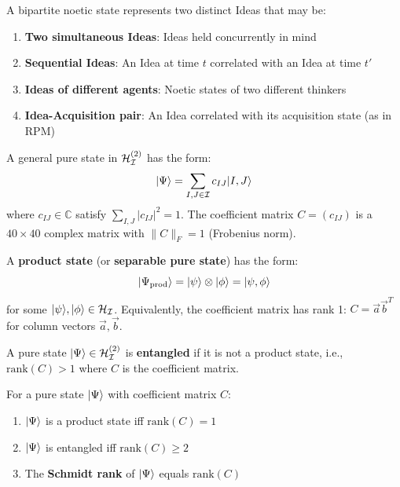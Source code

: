 \begin{remark}
\label{rem:bipartite-interpretation}
A bipartite noetic state represents two distinct Ideas that may be:
\begin{enumerate}
  \item \textbf{Two simultaneous Ideas}: Ideas held concurrently in mind
  \item \textbf{Sequential Ideas}: An Idea at time $t$ correlated with an Idea at time $t'$
  \item \textbf{Ideas of different agents}: Noetic states of two different thinkers
  \item \textbf{Idea-Acquisition pair}: An Idea correlated with its acquisition state (as in RPM)
\end{enumerate}
\end{remark}

\begin{definition}
\label{def:general-bipartite}
A general pure state in $\mathcal{H}_{\mathcal{I}}^{(2)}$ has the form:
\[
|\Psi\rangle = \sum_{I, J \in \mathcal{I}} c_{IJ} |I, J\rangle
\]
where $c_{IJ} \in \mathbb{C}$ satisfy $\sum_{I,J} |c_{IJ}|^2 = 1$. The coefficient matrix $C = (c_{IJ})$ is a $40 \times 40$ complex matrix with $\|C\|_F = 1$ (Frobenius norm).
\end{definition}

\begin{definition}
\label{def:product-state-v73}
A \textbf{product state} (or \textbf{separable pure state}) has the form:
\[
|\Psi_{\mathrm{prod}}\rangle = |\psi\rangle \otimes |\phi\rangle = |\psi, \phi\rangle
\]
for some $|\psi\rangle, |\phi\rangle \in \mathcal{H}_{\mathcal{I}}$. Equivalently, the coefficient matrix has rank 1: $C = \vec{a} \vec{b}^T$ for column vectors $\vec{a}, \vec{b}$.
\end{definition}

\begin{definition}
\label{def:entangled-pure}
A pure state $|\Psi\rangle \in \mathcal{H}_{\mathcal{I}}^{(2)}$ is \textbf{entangled} if it is not a product state, i.e., $\mathrm{rank}(C) > 1$ where $C$ is the coefficient matrix.
\end{definition}

\begin{proposition}
\label{prop:entanglement-criterion}
For a pure state $|\Psi\rangle$ with coefficient matrix $C$:
\begin{enumerate}
  \item $|\Psi\rangle$ is a product state iff $\mathrm{rank}(C) = 1$
  \item $|\Psi\rangle$ is entangled iff $\mathrm{rank}(C) \geq 2$
  \item The \textbf{Schmidt rank} of $|\Psi\rangle$ equals $\mathrm{rank}(C)$
\end{enumerate}
\end{proposition}

